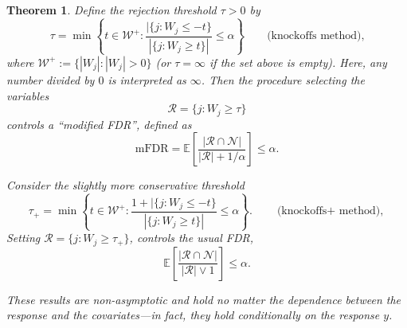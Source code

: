 \documentclass[11pt]{article}
\theoremstyle{plain}
\newtheorem{theorem}{Theorem}[section]
\theoremstyle{definition}
\newcommand{\N}{\mathcal{N}}
\newcommand{\R}{\mathcal{R}}
\begin{document}
 \begin{theorem} \label{thmKOmethods}
Define the rejection  threshold $\tau > 0$ by 
$$
\tau
= \min\left\{
t\in \mathcal{W}^+ :
\frac{|\{j : W_j \le -t\}}{|\{j : W_j \ge t\}|} \le \alpha
\right\}
\qquad
\text{(knockoffs method),}
$$
where $\mathcal{W}^+:=\{|W_j|: |W_j|>0\}$ (or $\tau = \infty$ if the set above is empty). Here, any number divided  by $0$ is interpreted as $\infty$.
Then the procedure selecting the variables
$$
\R = \{ j : W_j \ge \tau \}
$$
controls  a ``modified FDR'', defined as
\[
\mathrm{mFDR}
= \mathbb{E}\!\left[
\frac{|\R \cap \N|}{|\R| + 1/\alpha}
\right]
\le \alpha.
\]

\medskip

Consider the slightly more conservative threshold
$$
\tau_+ = 
\min\left\{ t \in \mathcal{W}^+ :
\frac{1 + |\{j : W_j \le -t\}}{|\{j : W_j \ge t\}|} \le \alpha
\right\}.
\qquad
\text{(knockoffs$+$ method),}
$$
Setting $\R = \{ j : W_j \ge \tau_+ \}$, controls the usual FDR,
\[
\mathbb{E}\!\left[
\frac{|\R \cap\N|}{|\R| \vee 1}
\right]
\le \alpha.
\]

\medskip

These results are non-asymptotic and hold no matter the dependence between the response
and the covariates—in fact, they hold \emph{conditionally} on the response $y$.

\end{theorem}
\end{document}
